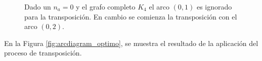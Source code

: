     \begin{figure}
		\centering
		
		
		\caption{Dado un $n_a=0$ y el grafo completo $K_{4}$ el arco $(0,1)$ es ignorado para la transposición. En cambio se comienza la transposición con el arco $(0,2)$.}
		\label{fig:ejemplo_transposicion_completo}
	\end{figure}
	
	
	
	En la Figura \ref{fig:arcdiagram_optimo}, se muestra el resultado de la  aplicación del proceso de  transposición.
	
